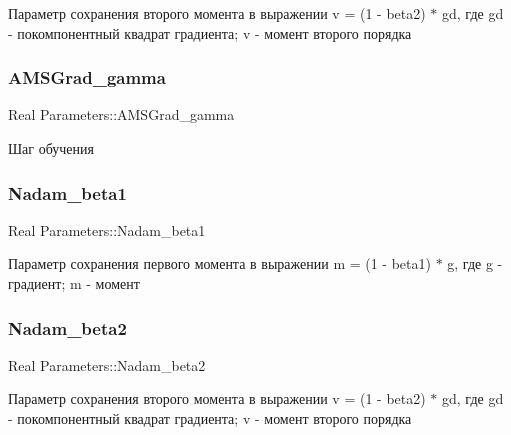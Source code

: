 Параметр сохранения второго момента в выражении v = (1 -\/ beta2) $\ast$ gd, где gd -\/ покомпонентный квадрат градиента; v -\/ момент второго порядка \mbox{\label{structParameters_a7d974fd144aa816e6d93a1c8cc666cbc}} 
\subsubsection{\texorpdfstring{A\+M\+S\+Grad\+\_\+gamma}{AMSGrad\_gamma}}
{\footnotesize\ttfamily Real Parameters\+::\+A\+M\+S\+Grad\+\_\+gamma\hspace{0.3cm}{\ttfamily [static]}}

Шаг обучения \mbox{\label{structParameters_a284908bd2b8c0870ed3d8b91e9b36ce1}} 
\subsubsection{\texorpdfstring{Nadam\+\_\+beta1}{Nadam\_beta1}}
{\footnotesize\ttfamily Real Parameters\+::\+Nadam\+\_\+beta1\hspace{0.3cm}{\ttfamily [static]}}

Параметр сохранения первого момента в выражении m = (1 -\/ beta1) $\ast$ g, где g -\/ градиент; m -\/ момент \mbox{\label{structParameters_a5c13cf58c0e058aabb32fce5077a25ba}} 
\subsubsection{\texorpdfstring{Nadam\+\_\+beta2}{Nadam\_beta2}}
{\footnotesize\ttfamily Real Parameters\+::\+Nadam\+\_\+beta2\hspace{0.3cm}{\ttfamily [static]}}

Параметр сохранения второго момента в выражении v = (1 -\/ beta2) $\ast$ gd, где gd -\/ покомпонентный квадрат градиента; v -\/ момент второго порядка \mbox{\label{structParameters_a5423a84040552a929659b92fbc2a24a9}} 
